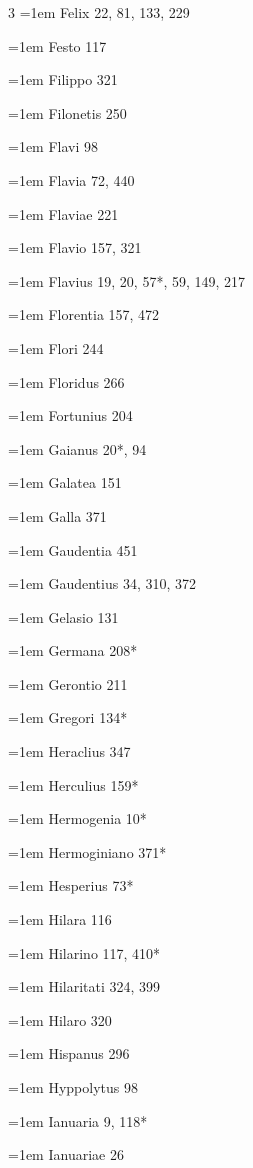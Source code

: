 \begin{multicols}{3}
\hangindent=1em Felix 22, 81, 133, 229\par
\hangindent=1em Festo 117\par
\hangindent=1em Filippo 321\par
\hangindent=1em Filonetis 250\par
\hangindent=1em Flavi 98\par
\hangindent=1em Flavia 72, 440\par
\hangindent=1em Flaviae 221\par
\hangindent=1em Flavio 157, 321\par
\hangindent=1em Flavius 19, 20, 57*, 59, 149, 217\par
\hangindent=1em Florentia 157, 472\par
\hangindent=1em Flori 244\par
\hangindent=1em Floridus 266\par
\hangindent=1em Fortunius 204\par
\hangindent=1em Gaianus 20*, 94\par
\hangindent=1em Galatea 151\par
\hangindent=1em Galla 371\par
\hangindent=1em Gaudentia 451\par
\hangindent=1em Gaudentius 34, 310, 372\par
\hangindent=1em Gelasio 131\par
\hangindent=1em Germana 208*\par
\hangindent=1em Gerontio 211\par
\hangindent=1em Gregori 134*\par
\hangindent=1em Heraclius 347\par
\hangindent=1em Herculius 159*\par
\hangindent=1em Hermogenia 10*\par
\hangindent=1em Hermoginiano 371*\par
\hangindent=1em Hesperius 73*\par
\hangindent=1em Hilara 116\par
\hangindent=1em Hilarino 117, 410*\par
\hangindent=1em Hilaritati 324, 399\par
\hangindent=1em Hilaro 320\par
\hangindent=1em Hispanus 296\par
\hangindent=1em Hyppolytus 98\par
\hangindent=1em Ianuaria 9, 118*\par
\hangindent=1em Ianuariae 26\par

\end{multicols}
